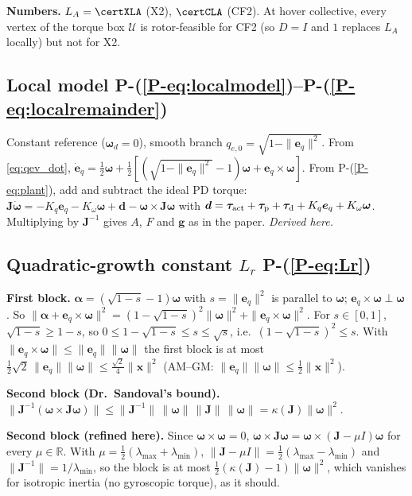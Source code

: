 \documentclass[11pt]{article}
\newcommand{\srcroot}{../../..}
\newcommand{\R}{\mathbb R}
\newcommand{\PE}[1]{P-(\ref{P-#1})}          %
\newcommand{\code}[1]{\texttt{\detokenize{#1}}}
\theoremstyle{remark}
\newcommand{\listing}[4]{%
  }
\begin{document}
\textbf{Numbers.} $L_A=\certXLA$ (X2), $\certCLA$ (CF2). At hover collective, every vertex of the torque box
$\mathcal U$ is rotor-feasible for CF2 (so $D=I$ and $1$ replaces $L_A$ locally) but not for X2.
\listing{experiments/theory_certificate_2026-09-12/compute_local_certificate.py}{122}{130}{$L_A$ over 16 vertices; hover feasibility of $\mathcal U$}

\subsection{Local model \PE{eq:localmodel}--\PE{eq:localremainder}}
Constant reference ($\bm\omega_d=0$), smooth branch $q_{e,0}=\sqrt{1-\|\bm e_q\|^2}$. From \eqref{eq:qev_dot},
$\dot{\bm e}_q=\frac12\bm\omega+\frac12[(\sqrt{1-\|\bm e_q\|^2}-1)\bm\omega+\bm e_q\times\bm\omega]$.
From \PE{eq:plant}, add and subtract the ideal PD torque:
$\bm J\dot{\bm\omega}=-K_q\bm e_q-K_\omega\bm\omega+\bm d-\bm\omega\times\bm J\bm\omega$ with
$\bm d=\bm\tau_{\rm act}+\bm\tau_{\rm p}+\bm\tau_{\rm d}+K_q\bm e_q+K_\omega\bm\omega$. Multiplying by
$\bm J^{-1}$ gives $A$, $F$ and $\bm g$ as in the paper. \emph{Derived here.}

\subsection{Quadratic-growth constant $L_r$ \PE{eq:Lr}}
\textbf{First block.} $\bm\alpha=(\sqrt{1-s}-1)\bm\omega$ with $s=\|\bm e_q\|^2$ is parallel to $\bm\omega$;
$\bm e_q\times\bm\omega\perp\bm\omega$. So
$\|\bm\alpha+\bm e_q\times\bm\omega\|^2=(1-\sqrt{1-s})^2\|\bm\omega\|^2+\|\bm e_q\times\bm\omega\|^2$.
For $s\in[0,1]$, $\sqrt{1-s}\ge1-s$, so $0\le1-\sqrt{1-s}\le s\le\sqrt s$, i.e.\ $(1-\sqrt{1-s})^2\le s$. With
$\|\bm e_q\times\bm\omega\|\le\|\bm e_q\|\|\bm\omega\|$ the first block is at most
$\tfrac12\sqrt2\,\|\bm e_q\|\|\bm\omega\|\le\frac{\sqrt2}{4}\|\bm x\|^2$ (AM--GM:
$\|\bm e_q\|\|\bm\omega\|\le\frac12\|\bm x\|^2$).

\textbf{Second block (Dr.\ Sandoval's bound).} $\|\bm J^{-1}(\bm\omega\times\bm J\bm\omega)\|\le\|\bm J^{-1}\|\,
\|\bm\omega\|\,\|\bm J\|\,\|\bm\omega\|=\kappa(\bm J)\|\bm\omega\|^2$.

\textbf{Second block (refined here).} Since $\bm\omega\times\bm\omega=0$,
$\bm\omega\times\bm J\bm\omega=\bm\omega\times(\bm J-\mu I)\bm\omega$ for every $\mu\in\R$. With
$\mu=\frac12(\lambda_{\max}+\lambda_{\min})$, $\|\bm J-\mu I\|=\frac12(\lambda_{\max}-\lambda_{\min})$ and
$\|\bm J^{-1}\|=1/\lambda_{\min}$, so the block is at most $\frac12(\kappa(\bm J)-1)\|\bm\omega\|^2$, which
vanishes for isotropic inertia (no gyroscopic torque), as it should.
\end{document}
